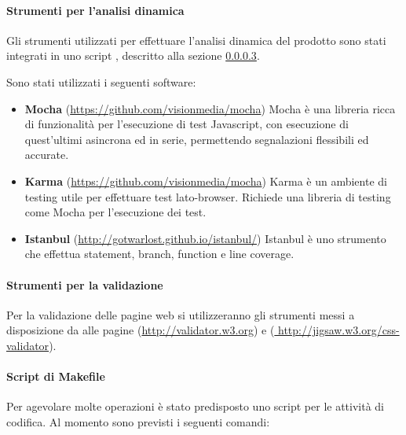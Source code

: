 		\paragraph{Strumenti per l'analisi dinamica} 
		Gli strumenti utilizzati per effettuare l'analisi dinamica del prodotto sono stati
	integrati in uno script , descritto alla sezione \ref{makefile-codifica}.
		
		Sono stati utilizzati i seguenti software:
		\begin{itemize}
		\item \textbf{Mocha} (\url{https://github.com/visionmedia/mocha}) Mocha è una libreria ricca di funzionalità per l'esecuzione
		di test Javascript, con esecuzione di quest'ultimi asincrona ed in serie, permettendo segnalazioni flessibili ed accurate.
		\item \textbf{Karma} (\url{https://github.com/visionmedia/mocha}) Karma è un ambiente di testing utile per effettuare test lato-browser. Richiede una libreria di testing come Mocha per l'esecuzione dei test.
		\item \textbf{Istanbul} (\url{http://gotwarlost.github.io/istanbul/}) Istanbul è uno strumento che effettua statement, branch, function e line coverage.
		\end{itemize}
		
		\paragraph{Strumenti per la validazione}
		
		Per la validazione delle pagine web si utilizzeranno gli strumenti messi a disposizione da  alle pagine 
		 (\url{http://validator.w3.org}) e (\url{ http://jigsaw.w3.org/css-validator}).			
		
		\paragraph{Script di Makefile}
		\label{makefile-codifica}

Per agevolare molte operazioni è stato predisposto uno script  per le attività di codifica. Al momento sono previsti i seguenti comandi:

